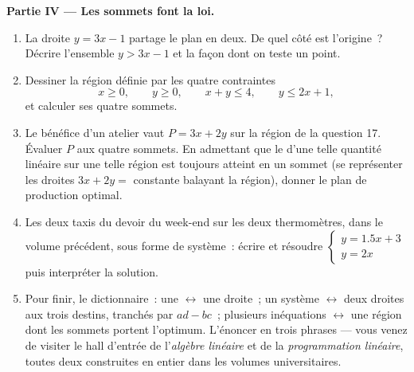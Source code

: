 \begin{problem}
\medskip
\noindent\textbf{Partie IV --- Les sommets font la loi.}
\begin{enumerate}[resume]
  \item La droite $y = 3x - 1$ partage le plan en deux. De quel
        côté est l'origine~? Décrire l'ensemble $y > 3x - 1$ et la
        façon dont on teste un point.
  \item Dessiner la région définie par les quatre contraintes
        \[
        x \geq 0, \qquad y \geq 0, \qquad x + y \leq 4,
        \qquad y \leq 2x + 1,
        \]
        et calculer ses quatre sommets.
  \item Le bénéfice d'un atelier vaut $P = 3x + 2y$ sur la région
        de la question 17. Évaluer $P$ aux quatre sommets. En
        admettant que le  d'une telle quantité linéaire sur
        une telle région est toujours atteint en un sommet (se
        représenter les droites $3x + 2y = $ constante balayant la
        région), donner le plan de production optimal.
  \item Les deux taxis du devoir du week-end sur les deux
        thermomètres, dans le volume précédent, sous forme de
        système~: écrire et résoudre
        $\begin{cases} y = 1.5x + 3 \\ y = 2x \end{cases}$ puis
        interpréter la solution.
  \item Pour finir, le dictionnaire~: une  $\leftrightarrow$
        une droite~; un système $\leftrightarrow$ deux droites aux
        trois destins, tranchés par $ad - bc$~; plusieurs
        inéquations $\leftrightarrow$ une région dont les sommets
        portent l'optimum. L'énoncer en trois phrases --- vous
        venez de visiter le hall d'entrée de l'\emph{algèbre
        linéaire} et de la \emph{programmation linéaire}, toutes
        deux construites en entier dans les volumes universitaires.
\end{enumerate}
\end{problem}
